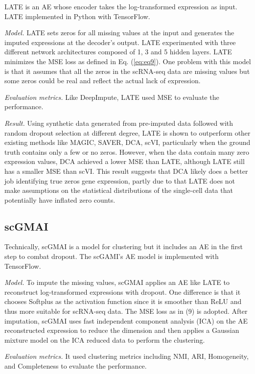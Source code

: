 \documentclass[
]{book}
\begin{document}
LATE \citep{RN184} is an AE whose encoder takes the log-transformed expression as input. LATE implemented in Python with TensorFlow.

\emph{Model. } LATE sets zeros for all missing values at the input and generates the imputed expressions at the decoder's output. LATE experimented with three different network architectures composed of 1, 3 and 5 hidden layers. LATE minimizes the MSE loss as defined in Eq. (\eqref{eq:eq9}). One problem with this model is that it assumes that all the zeros in the scRNA-seq data are missing values but some zeros could be real and reflect the actual lack of expression.

\emph{Evaluation metrics.} Like DeepImpute, LATE used MSE to evaluate the performance.

\emph{Result.} Using synthetic data generated from pre-imputed data followed with random dropout selection at different degree, LATE is shown to outperform other existing methods like MAGIC, SAVER, DCA, scVI, particularly when the ground truth contains only a few or no zeros. However, when the data contain many zero expression values, DCA achieved a lower MSE than LATE, although LATE still has a smaller MSE than scVI. This result suggests that DCA likely does a better job identifying true zeros gene expression, partly due to that LATE does not make assumptions on the statistical distributions of the single-cell data that potentially have inflated zero counts.

\hypertarget{ch-5-1-5}{%
\subsection{scGMAI}\label{ch-5-1-5}}

Technically, scGMAI \citep{RN109} is a model for clustering but it includes an AE in the first step to combat dropout. The scGAMI's AE model is implemented with TensorFlow.

\emph{Model. } To impute the missing values, scGMAI applies an AE like LATE to reconstruct log-transformed expressions with dropout. One difference is that it chooses Softplus as the activation function since it is smoother than ReLU and thus more suitable for scRNA-seq data. The MSE loss as in (9) is adopted.
After imputation, scGMAI uses fast independent component analysis (ICA) on the AE reconstructed expression to reduce the dimension and then applies a Gaussian mixture model on the ICA reduced data to perform the clustering.

\emph{Evaluation metrics.} It used clustering metrics including NMI, ARI, Homogeneity, and Completeness to evaluate the performance.
\end{document}
